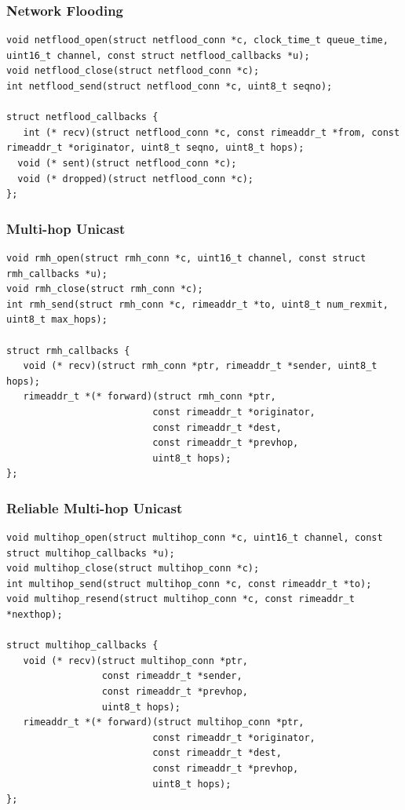 \subsubsection{Network Flooding}

\begin{verbatim}
void netflood_open(struct netflood_conn *c, clock_time_t queue_time, uint16_t channel, const struct netflood_callbacks *u);
void netflood_close(struct netflood_conn *c);
int netflood_send(struct netflood_conn *c, uint8_t seqno);

struct netflood_callbacks {
   int (* recv)(struct netflood_conn *c, const rimeaddr_t *from, const rimeaddr_t *originator, uint8_t seqno, uint8_t hops);
  void (* sent)(struct netflood_conn *c);
  void (* dropped)(struct netflood_conn *c);
};
\end{verbatim}

\subsubsection{Multi-hop Unicast}

\begin{verbatim}
void rmh_open(struct rmh_conn *c, uint16_t channel, const struct rmh_callbacks *u);
void rmh_close(struct rmh_conn *c);
int rmh_send(struct rmh_conn *c, rimeaddr_t *to, uint8_t num_rexmit, uint8_t max_hops);

struct rmh_callbacks {
   void (* recv)(struct rmh_conn *ptr, rimeaddr_t *sender, uint8_t hops);
   rimeaddr_t *(* forward)(struct rmh_conn *ptr,
                          const rimeaddr_t *originator,
                          const rimeaddr_t *dest,
                          const rimeaddr_t *prevhop,
                          uint8_t hops);
};
\end{verbatim}

\subsubsection{Reliable Multi-hop Unicast}

\begin{verbatim}
void multihop_open(struct multihop_conn *c, uint16_t channel, const struct multihop_callbacks *u);
void multihop_close(struct multihop_conn *c);
int multihop_send(struct multihop_conn *c, const rimeaddr_t *to);
void multihop_resend(struct multihop_conn *c, const rimeaddr_t *nexthop);

struct multihop_callbacks {
   void (* recv)(struct multihop_conn *ptr,
                 const rimeaddr_t *sender,
                 const rimeaddr_t *prevhop,
                 uint8_t hops);
   rimeaddr_t *(* forward)(struct multihop_conn *ptr,
                          const rimeaddr_t *originator,
                          const rimeaddr_t *dest,
                          const rimeaddr_t *prevhop,
                          uint8_t hops);
};
\end{verbatim}



